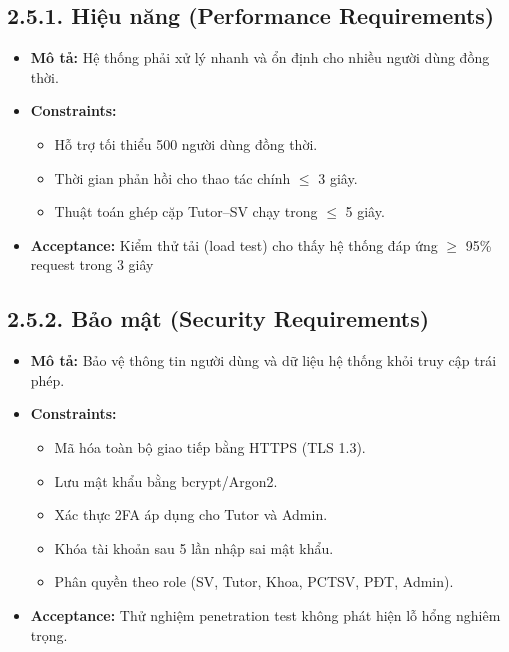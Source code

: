 \subsection*{2.5.1. Hiệu năng (Performance Requirements)}
\begin{itemize}
    \item \textbf{Mô tả:} Hệ thống phải xử lý nhanh và ổn định cho nhiều người dùng đồng thời.
    \item \textbf{Constraints:}
    \begin{itemize}
        \item Hỗ trợ tối thiểu 500 người dùng đồng thời.
        \item Thời gian phản hồi cho thao tác chính $\leq$ 3 giây.
        \item Thuật toán ghép cặp Tutor–SV chạy trong $\leq$ 5 giây.
    \end{itemize}
    \item \textbf{Acceptance:} Kiểm thử tải (load test) cho thấy hệ thống đáp ứng $\geq$ 95\% request trong 3 giây
\end{itemize}


\subsection*{2.5.2. Bảo mật (Security Requirements)}
\begin{itemize}
    \item \textbf{Mô tả:} Bảo vệ thông tin người dùng và dữ liệu hệ thống khỏi truy cập trái phép.
    \item \textbf{Constraints:}
    \begin{itemize}
        \item Mã hóa toàn bộ giao tiếp bằng HTTPS (TLS 1.3).
        \item Lưu mật khẩu bằng bcrypt/Argon2.
        \item Xác thực 2FA áp dụng cho Tutor và Admin. 
        \item Khóa tài khoản sau 5 lần nhập sai mật khẩu.
        \item Phân quyền theo role (SV, Tutor, Khoa, PCTSV, PĐT, Admin).
    \end{itemize}
    \item \textbf{Acceptance:} Thử nghiệm penetration test không phát hiện lỗ hổng nghiêm trọng.
\end{itemize}

